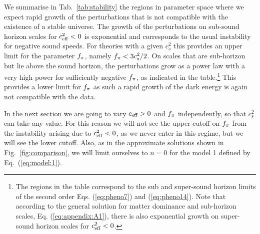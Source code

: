 We summarise in Tab.\ \ref{tab:stability} the regions in parameter space where we expect rapid growth of the perturbations
that is not compatible with the existence of a stable universe. The growth of the perturbations on sub-sound horizon scales for $c_{\rm eff}^2<0$
is exponential and corresponds to the usual instability for negative sound speeds. For theories with a given $c_s^2$ this provides an
upper limit for the parameter $f_\pi$, namely $f_\pi < 3 c_s^2 /2$. On scales that are sub-horizon but lie above the sound horizon,
the perturbations grow as a power law with a very high power for sufficiently negative $f_\pi$, as indicated in the table.\footnote{The regions in the table correspond to the sub and super-sound horizon limits of the second order Eqs. (\ref{eq:pheno7}) and (\ref{eq:pheno14}). Note that according to the general solution for matter dominance and sub-horizon scales, Eq. (\ref{eq:appendix:A1}),  there is also exponential growth on super-sound horizon scales for $ c_{\rm eff}^2<0 $.} This provides
a lower limit for $f_\pi$ as such a rapid growth of the dark energy is again not compatible with the data.

In the next section we are going to vary $c_{\rm eff}>0$ and $f_\pi$ independently, so that $c_s^2$ can take any value. For this reason we
will not see the upper cutoff on $f_\pi$ from the instability arising due to $c_{\rm eff}^2<0$, as we never enter in this regime, but we will
see the lower cutoff. Also, as in the approximate solutions shown in Fig.\ \ref{fig:comparison}, we will limit ourselves to $n=0$ for
the model 1 defined by Eq.\ (\ref{eq:model:1}).

